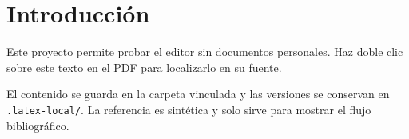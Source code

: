 \section{Introducci\'on}\label{sec:introduccion}
Este proyecto permite probar el editor sin documentos personales.
Haz doble clic sobre este texto en el PDF para localizarlo en su fuente.

El contenido se guarda en la carpeta vinculada y las versiones se conservan
en \texttt{.latex-local/}. La referencia \cite{Demo2026} es sint\'etica y
solo sirve para mostrar el flujo bibliogr\'afico.
